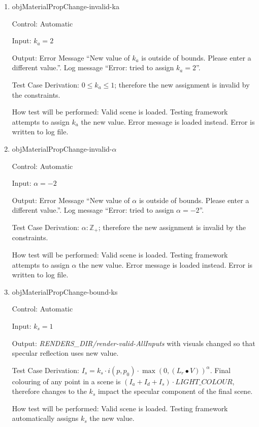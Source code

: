 \documentclass[12pt, titlepage]{article}
\begin{document}
\begin{enumerate}
	\item{objMaterialPropChange-invalid-ka\\}
	
	Control: Automatic
	
	Input: $k_{a} = 2$
	
	Output: Error Message ``New value of $k_{a}$ is outside of bounds. Please 
	enter a different value.''. Log message ``Error: tried to assign $k_{a} = 
	2$''. 
	
	Test Case Derivation: $0 \le k_{a} \le 1$; therefore the new assignment is 
	invalid by the constraints.
	
	How test will be performed: Valid scene is loaded. Testing framework 
	attempts to assign $k_{a}$ the new value. Error message is loaded instead. 
	Error is written to log file.

	\item{objMaterialPropChange-invalid-$\alpha$\\}
	
	Control: Automatic
	
	Input: $\alpha = -2$
	
	Output: Error Message ``New value of $\alpha$ is outside of bounds. Please 
	enter a different value.''. Log message ``Error: tried to assign $\alpha = 
	-2$''. 
	
	Test Case Derivation: $\alpha : \mathbb{Z_{+}}$; therefore the new 
	assignment 
	is invalid by the constraints.
	
	How test will be performed: Valid scene is loaded. Testing framework 
	attempts to assign $\alpha$ the new value. Error message is loaded instead. 
	Error is written to log file.

	\item{objMaterialPropChange-bound-ks\\}
	
	Control: Automatic
	
	Input: $k_{s} = 1$
	
	Output: \textit{RENDERS\_DIR/render-valid-AllInputs} with visuals changed 
	so that specular reflection uses new value.
	
	Test Case Derivation: $I_{s} = k_{s}\cdot i(p,p_{0}) \cdot \max(0, 
	({L_{r}}\bullet V))^\alpha$. Final colouring of any point in a scene is 
	$(I_{a}+I_{d}+I_{s})\cdot LIGHT\_COLOUR$, therefore changes to the $k_{s}$ 
	impact the specular component of the final scene.
	
	How test will be performed: Valid scene is loaded. Testing framework 
	automatically assigns $k_{s}$ the new value. 
	

\end{enumerate}
\end{document}
